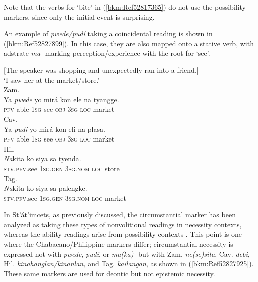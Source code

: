 \documentclass[output=paper,colorlinks,citecolor=brown]{langscibook}
\begin{document}
Note that the verbs for ‘bite' in (\ref{bkm:Ref52817365}) do not use the possibility markers, since only the initial event is surprising.

An example of \textit{pwede/pudí} taking a coincidental reading is shown in (\ref{bkm:Ref52827899}). In this case, they are also mapped onto a stative verb, with adstrate \textit{ma-} marking perception/experience with the root for ‘see’.

\ea
{\label{bkm:Ref52827899}[The speaker was shopping and unexpectedly ran into a friend.]}\\
{‘I saw her at the market/store.’}\\
\ea
{Zam.}\\
\gll Ya \textit{pwede} yo mirá kon   ele na  tyangge.\\
     \textsc{pfv} able \textsc{1sg} see \textsc{obj} 3\textsc{sg} \textsc{loc} market\\
\ex
{Cav.}\\
\gll Ya \textit{pudí} yo mirá kon eli na plasa.\\
     \textsc{pfv} able \textsc{1sg} see \textsc{obj} 3\textsc{sg} \textsc{loc} market\\
\ex
{Hil.}\\
\gll \textit{Na}kita ko siya sa tyenda.\\
     \textsc{stv.pfv.}see 1\textsc{sg.gen} 3\textsc{sg.nom} \textsc{loc} store\\
\ex
{Tag.}\\
\gll \textit{Na}kita ko siya sa palengke.\\
     \textsc{stv.pfv.}see 1\textsc{sg.gen} 3\textsc{sg.nom} \textsc{loc} market\\
\z
\z

In St’át’imcets, as previously discussed, the circumstantial marker has been analyzed as taking these types of nonvolitional readings in necessity contexts, whereas the ability readings arise from possibility contexts \citep{DavisRullmann2009}. This point is one where the Chabacano/Philippine markers differ; circumstantial necessity is expressed not with \textit{pwede}, \textit{pudí}, or \textit{ma(ka)-} but with Zam. \textit{ne(se)sita}, Cav. \textit{debi}, Hil. \textit{kinahanglan/kinanlan,} and Tag. \textit{kailangan}, as shown in (\ref{bkm:Ref52827925}). These same markers are used for deontic but not epistemic necessity.
\end{document}
